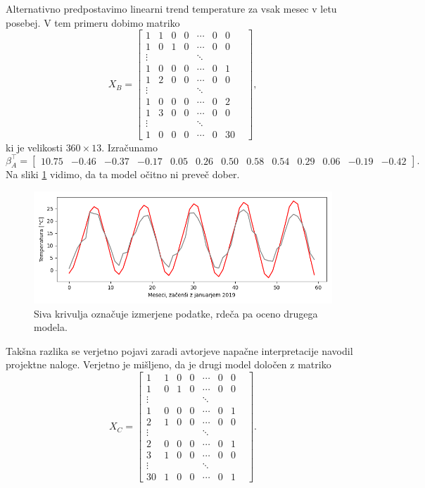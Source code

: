 \documentclass[12pt, a4paper]{article}
\begin{document}
Alternativno predpostavimo linearni trend temperature za 
vsak mesec v letu posebej. V tem primeru dobimo matriko
\[
    X_B = \begin{bmatrix}
        1 & 1 & 0 & 0 & \cdots & 0 & 0 \\
        1 & 0 & 1 & 0 & \cdots & 0 & 0 \\
        \vdots & & & & \ddots & & & \\
        1 & 0 & 0 & 0 & \cdots & 0 & 1 \\
        1 & 2 & 0 & 0 & \cdots & 0 & 0 \\
        \vdots & & & & \ddots & & & \\
        1 & 0 & 0 & 0 & \cdots & 0 & 2 \\
        1 & 3 & 0 & 0 & \cdots & 0 & 0 \\
        \vdots & & & & \ddots & & & \\
        1 & 0 & 0 & 0 & \cdots & 0 & 30 
    \end{bmatrix},
\]
ki je velikosti $360 \times 13$. Izračunamo
\setcounter{MaxMatrixCols}{20}
\footnotesize
\[
    \beta_A^\top = \begin{bmatrix}
        10.75 & -0.46 & -0.37 & -0.17 & 0.05 & 0.26 & 
        0.50 & 0.58 & 0.54 & 0.29 & 0.06 & -0.19 & -0.42
    \end{bmatrix}.
\]
\normalsize
Na sliki \ref{png:drugi} vidimo, da ta model očitno ni preveč dober.
\begin{figure}[H]
    \centering
    \includegraphics[width=14cm]{Slike/drugi_model.png}
    \caption{Siva krivulja označuje izmerjene podatke, rdeča pa oceno 
    drugega modela.}
    \label{png:drugi}
\end{figure}
Takšna razlika se verjetno pojavi zaradi avtorjeve napačne interpretacije navodil 
projektne naloge. Verjetno je mišljeno, da je drugi model določen z matriko
\[
    X_C = \begin{bmatrix}
        1 & 1 & 0 & 0 & \cdots & 0 & 0 \\
        1 & 0 & 1 & 0 & \cdots & 0 & 0 \\
        \vdots & & & & \ddots & & & \\
        1 & 0 & 0 & 0 & \cdots & 0 & 1 \\
        2 & 1 & 0 & 0 & \cdots & 0 & 0 \\
        \vdots & & & & \ddots & & & \\
        2 & 0 & 0 & 0 & \cdots & 0 & 1 \\
        3 & 1 & 0 & 0 & \cdots & 0 & 0 \\
        \vdots & & & & \ddots & & & \\
        30 & 1 & 0 & 0 & \cdots & 0 & 1 
    \end{bmatrix}.
\]
\end{document}

